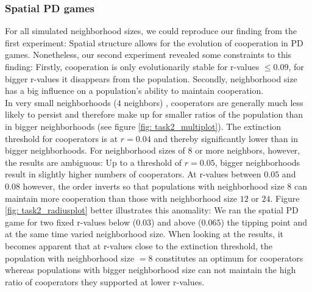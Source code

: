 \subsubsection*{Spatial PD games}
For all simulated neighborhood sizes, we could reproduce our finding from the first experiment: Spatial structure allows for the evolution of cooperation in PD games. Nonetheless, our second experiment revealed some constraints to this finding: Firstly, cooperation is only evolutionarily stable for r-values $ \leq 0.09$, for bigger r-values it disappears from the population. Secondly, neighborhood size has a big influence on a population's ability to maintain cooperation.\\
In very small neighborhoods ($4$ neighbors) , cooperators are generally much less likely to persist and therefore make up for smaller ratios of the population than in bigger neighborhoods (see figure \ref{fig: task2_multiplot}). The extinction threshold for cooperators is at $r=0.04$ and thereby significantly lower than in bigger neighborhoods. For neighborhood sizes of $8$ or more neighbors, however, the results are ambiguous: Up to a threshold of $r=0.05$, bigger neighborhoods result in slightly higher numbers of cooperators. At r-values between $0.05$ and $0.08$ however, the order inverts so that populations with neighborhood size $8$ can maintain more cooperation than those with neighborhood size $12$ or $24$. 
Figure \ref{fig: task2_radiusplot} better illustrates this anomality: We ran the spatial PD game for two fixed r-values below ($0.03$) and above ($0.065$) the tipping point and at the same time varied neighborhood size. When looking at the results, it becomes apparent that at r-values close to the extinction threshold, the population with neighborhood size $=8$ constitutes an optimum for cooperators whereas populations with bigger neighborhood size can not maintain the high ratio of cooperators they supported at lower r-values.



